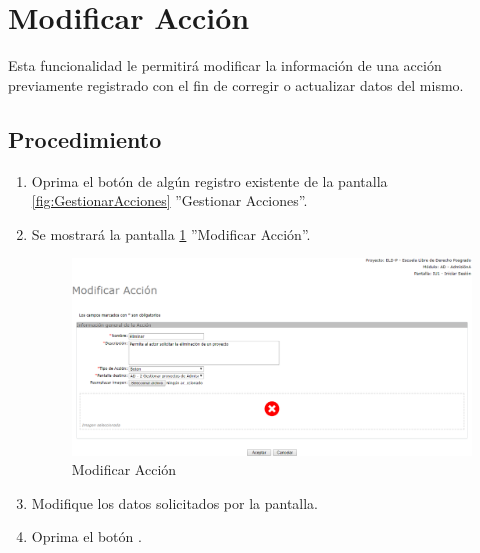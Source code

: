 \hypertarget{cv:modificarAccion}{\section{Modificar Acción}} \label{sec:modificarAccion}

	Esta funcionalidad le permitirá modificar la información de una acción previamente registrado con el fin de corregir o actualizar datos del mismo. 

		\subsection{Procedimiento}

			\begin{enumerate}
	
			\item Oprima el botón \IUEditar{} de algún registro existente de la pantalla \ref{fig:GestionarAcciones} ''Gestionar Acciones''.
	
			\item Se mostrará la pantalla \ref{fig:modificarAccion} ''Modificar Acción''.
			
			\begin{figure}[htbp!]
				\begin{center}
					\includegraphics[scale=0.5]{roles/lider/pantallas/acciones/pantallas/IU11-1-1-2modificarAccion}
					\caption{Modificar Acción}
					\label{fig:modificarAccion}
				\end{center}
			\end{figure}
		
			\item Modifique los datos solicitados por la pantalla.
						
			\item Oprima el botón \IUAceptar.
			

\end{enumerate}
